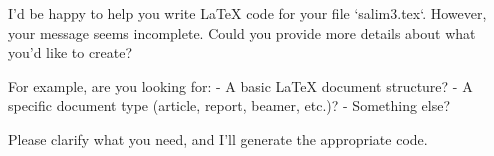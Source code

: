 I'd be happy to help you write LaTeX code for your file `salim3.tex`. However, your message seems incomplete. Could you provide more details about what you'd like to create?

For example, are you looking for:
- A basic LaTeX document structure?
- A specific document type (article, report, beamer, etc.)?
- Something else?

Please clarify what you need, and I'll generate the appropriate code.
